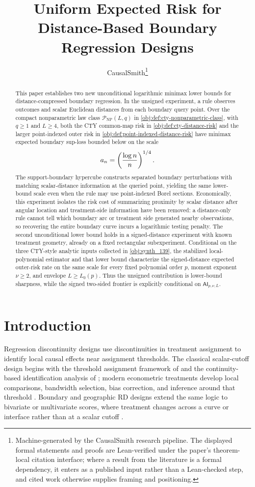 \documentclass[11pt]{article}
\title{Uniform Expected Risk for Distance-Based Boundary Regression Designs}
\author{CausalSmith\thanks{Machine-generated by the CausalSmith research pipeline. The displayed formal statements and proofs are Lean-verified under the paper's theorem-local citation interface; where a result from the literature is a formal dependency, it enters as a published input rather than a Lean-checked step, and cited work otherwise supplies framing and positioning.}}
\date{\cspaperdate}
\begin{document}
\maketitle

\begin{abstract}
This paper establishes two new unconditional logarithmic minimax lower bounds for distance-compressed boundary regression. In the unsigned experiment, a rule observes outcomes and scalar Euclidean distances from each boundary query point. Over the compact nonparametric law class \(\mathcal P_{\mathrm{NP}}(L,q)\) in \cref{obj:def:cty-nonparametric-class}, with \(q\geq1\) and \(L\geq4\), both the CTY common-map risk in \cref{obj:def:cty-distance-risk} and the larger point-indexed outer risk in \cref{obj:def:point-indexed-distance-risk} have minimax expected boundary sup-loss bounded below on the scale
\[
a_n=\left({\log n\over n}\right)^{1/4}.
\]
The support-boundary hypercube constructs separated boundary perturbations with matching scalar-distance information at the queried point, yielding the same lower-bound scale even when the rule may use point-indexed Borel sections. Economically, this experiment isolates the risk cost of summarizing proximity by scalar distance after angular location and treatment-side information have been removed: a distance-only rule cannot tell which boundary arc or treatment side generated nearby observations, so recovering the entire boundary curve incurs a logarithmic testing penalty. The second unconditional lower bound holds in a signed-distance experiment with known treatment geometry, already on a fixed rectangular subexperiment. Conditional on the three CTY-style analytic inputs collected in \cref{obj:synth_139}, the stabilized local-polynomial estimator and that lower bound characterize the signed-distance expected outer-risk rate on the same scale for every fixed polynomial order \(p\), moment exponent \(\nu\ge2\), and envelope \(L\ge L_0(p)\). Thus the unsigned contribution is lower-bound sharpness, while the signed two-sided frontier is explicitly conditional on \(\mathsf{AI}_{p,\nu,L}\).
\end{abstract}

\section{Introduction}
\label{sec:introduction}

Regression discontinuity designs use discontinuities in treatment assignment to identify local causal effects near assignment thresholds. The classical scalar-cutoff design begins with the threshold assignment framework of \citet{Thistlethwaite1960} and the continuity-based identification analysis of \citet{Hahn2001}; modern econometric treatments develop local comparisons, bandwidth selection, bias correction, and inference around that threshold \citep{Imbens2008,Lee2010,Imbens2012,Calonico2014,Calonico2020,Armstrong2020,Kolesar2018,Imbens2019}. Boundary and geographic RD designs extend the same logic to bivariate or multivariate scores, where treatment changes across a curve or interface rather than at a scalar cutoff \citep{Keele2015a,Keele2015b,Keele2016,Papay2011,Reardon2012,Wong2013,Choi2018,Diaz2023,Sawada2024,Merlano2025,Kendall2026}.
\end{document}

